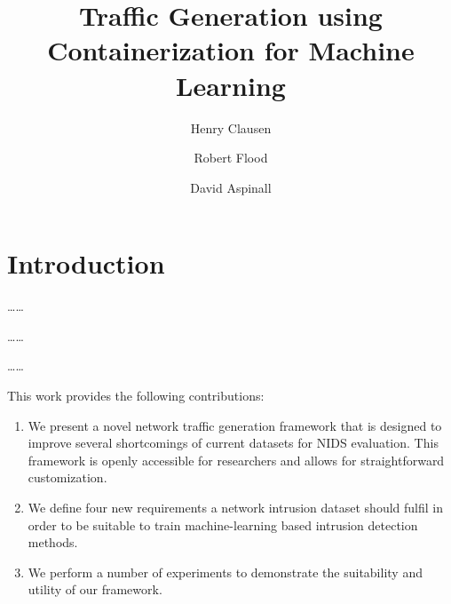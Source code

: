 \documentclass[sigconf]{acmart}
\begin{document}
\title{Traffic Generation using Containerization for Machine Learning}

\author{Henry Clausen}

\author{Robert Flood}

\author{David Aspinall}



\begin{abstract}

\end{abstract}


\maketitle

\section{Introduction}


\dots \dots

\dots \dots

\dots \dots

This work provides the following contributions:

\begin{enumerate}
 \item We present a novel network traffic generation framework that is designed to improve several shortcomings of current datasets for NIDS evaluation. This framework is openly accessible for researchers and allows for straightforward customization.
 \item We define four new requirements a network intrusion dataset should fulfil in order to be suitable to train machine-learning based intrusion detection methods. 
 \item We perform a number of experiments to demonstrate the suitability and utility of our framework. 
\end{enumerate}
\end{document}
